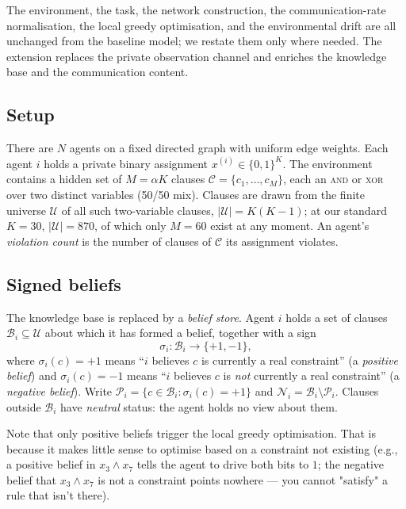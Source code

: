 \documentclass{article}
\begin{document}
The environment, the task, the network construction, the communication-rate normalisation, the local greedy optimisation, and the environmental drift are all unchanged from the baseline model; we restate them only where needed. The extension replaces the private observation channel and enriches the knowledge base and the communication content.

\subsection{Setup}

There are $N$ agents on a fixed directed graph with uniform edge weights. Each agent $i$ holds a private binary assignment $x^{(i)} \in \{0,1\}^K$. The environment contains a hidden set of $M = \alpha K$ clauses $\mathcal{C} = \{c_1, \dots, c_M\}$, each an \textsc{and} or \textsc{xor} over two distinct variables (50/50 mix). Clauses are drawn from the finite universe $\mathcal{U}$ of all such two-variable clauses, $|\mathcal{U}| = K(K-1)$; at our standard $K=30$, $|\mathcal{U}| = 870$, of which only $M=60$ exist at any moment. An agent's \emph{violation count} is the number of clauses of $\mathcal{C}$ its assignment violates.

\subsection{Signed beliefs}

The knowledge base is replaced by a \emph{belief store}. Agent $i$ holds a set of clauses $\mathcal{B}_i \subseteq \mathcal{U}$ about which it has formed a belief, together with a sign
$$
\sigma_i : \mathcal{B}_i \to \{+1, -1\},
$$
where $\sigma_i(c) = +1$ means ``$i$ believes $c$ is currently a real constraint'' (a \emph{positive belief}) and $\sigma_i(c) = -1$ means ``$i$ believes $c$ is \emph{not} currently a real constraint'' (a \emph{negative belief}). Write $\mathcal{P}_i = \{c \in \mathcal{B}_i : \sigma_i(c) = +1\}$ and $\mathcal{N}_i = \mathcal{B}_i \setminus \mathcal{P}_i$. Clauses outside $\mathcal{B}_i$ have \emph{neutral} status: the agent holds no view about them.

Note that only positive beliefs trigger the local greedy optimisation. That is because it makes little sense to optimise based on a constraint not existing (e.g., a positive belief in $x_3 \wedge x_7$ tells the agent to drive both bits to $1$; the negative belief that $x_3 \wedge x_7$ is not a constraint points nowhere — you cannot "satisfy" a rule that isn't there).
\end{document}
